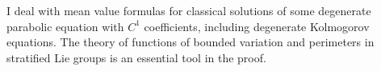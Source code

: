 \mypage
{}
\begin{myabstract}
I deal with mean value formulas for classical solutions of some degenerate parabolic equation with \protect $C^1$ coefficients, including degenerate Kolmogorov equations. The theory of functions of bounded variation and perimeters in stratified Lie groups is an essential tool in the proof.
\end{myabstract}


